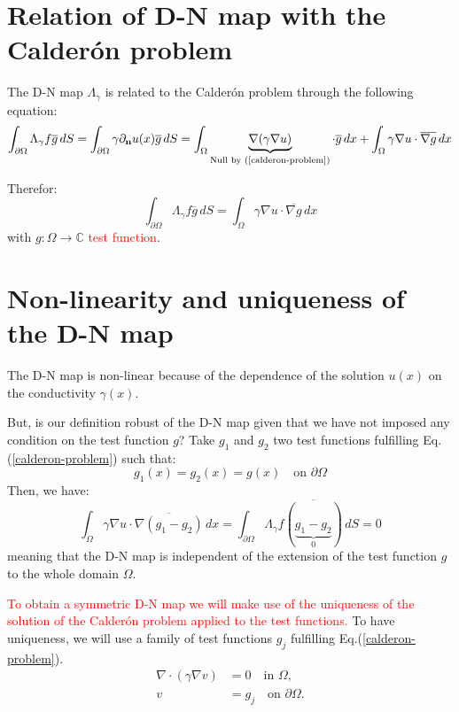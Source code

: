 \section*{Relation of D-N map with the Calderón problem}
The D-N map $\Lambda_{\gamma}$ is related to the Calderón problem through the following equation:
\begin{equation}
    \int_{\partial \Omega} \Lambda_{\gamma} f \overline{g} \, dS = \int_{\partial \Omega} \gamma \partial_{\mathbf{n}} u(x) \overline{g} \, dS = \int_{\Omega} \underbrace{\nabla ( \gamma \nabla u)}_{\text{Null by (\ref*{calderon-problem})}} \cdot \overline{ g} \, dx +  \int_{\Omega} \gamma \nabla u \cdot \overline{\nabla g} \, dx
\end{equation}

Therefor:
\begin{equation}\label{calderon-dn}
    \int_{\partial \Omega} \Lambda_{\gamma} f \overline{g} \, dS = \int_{\Omega} \gamma \nabla u \cdot \overline{\nabla g} \, dx
\end{equation}
with $g: \Omega \rightarrow \mathbb{C}$ \textcolor{red}{test function}.

\section*{Non-linearity and uniqueness of the D-N map}
The D-N map is non-linear because of the dependence of the solution $u(x)$ on the conductivity $\gamma(x)$.

But, is our definition robust of the D-N map given that we have not imposed any condition on the test function $g$?
Take $g_1$ and $g_2$ two test functions fulfilling Eq.(\ref*{calderon-problem}) such that:
\begin{equation}
    g_1(x) = g_2(x) = g(x) \quad \text{on } \partial \Omega
\end{equation}
Then, we have:
\begin{equation}
    \int_{\Omega} \gamma \nabla u \cdot \overline{\nabla (g_1 - g_2)} \, dx = \int_{\partial \Omega} \Lambda_{\gamma} f \overline{(\underbrace{g_1 - g_2}_{0})} \, dS = 0
\end{equation}
meaning that the D-N map is independent of the extension of the test function $g$ to the whole domain $\Omega$.

\textcolor{red}{To obtain a symmetric D-N map we will make use of the uniqueness of the solution of the Calderón problem applied to the test functions.} 
To have uniqueness, we will use a family of test functions $g_j$ fulfilling  Eq.(\ref*{calderon-problem}).
\begin{equation}
    \begin{aligned}
        \nabla \cdot (\gamma \nabla v) &= 0 \quad \text{in } \Omega, \\
        v &= g_j \quad \text{on } \partial \Omega.
    \end{aligned}
\end{equation}

